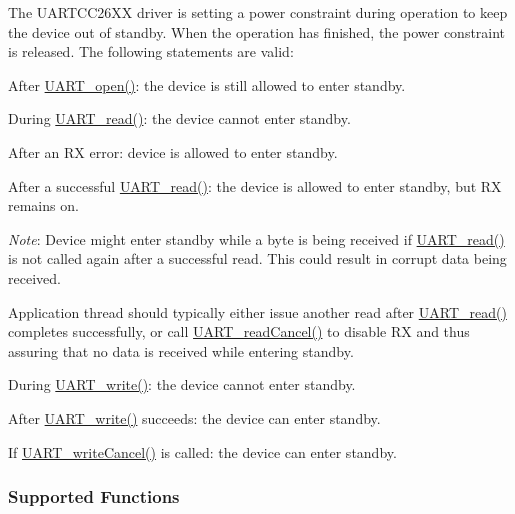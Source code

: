 The U\-A\-R\-T\-C\-C26\-X\-X driver is setting a power constraint during operation to keep the device out of standby. When the operation has finished, the power constraint is released. The following statements are valid\-:
\begin{DoxyItemize}
\item After \hyperlink{_u_a_r_t_8h_a0442ea1ec23901168da31726bb3254c1}{U\-A\-R\-T\-\_\-open()}\-: the device is still allowed to enter standby.
\item During \hyperlink{_u_a_r_t_8h_a023152d57539cad94bdd813956013e73}{U\-A\-R\-T\-\_\-read()}\-: the device cannot enter standby.
\item After an R\-X error\-: device is allowed to enter standby.
\item After a successful \hyperlink{_u_a_r_t_8h_a023152d57539cad94bdd813956013e73}{U\-A\-R\-T\-\_\-read()}\-: the device is allowed to enter standby, but R\-X remains on.
\begin{DoxyItemize}
\item {\itshape Note}\-: Device might enter standby while a byte is being received if \hyperlink{_u_a_r_t_8h_a023152d57539cad94bdd813956013e73}{U\-A\-R\-T\-\_\-read()} is not called again after a successful read. This could result in corrupt data being received.
\item Application thread should typically either issue another read after \hyperlink{_u_a_r_t_8h_a023152d57539cad94bdd813956013e73}{U\-A\-R\-T\-\_\-read()} completes successfully, or call \hyperlink{_u_a_r_t_8h_a51ed7e94d5b409ca1fcb2d65c5a25c3c}{U\-A\-R\-T\-\_\-read\-Cancel()} to disable R\-X and thus assuring that no data is received while entering standby.
\end{DoxyItemize}
\item During \hyperlink{_u_a_r_t_8h_a6f2a04c09dc17886e69e361cd80aaedc}{U\-A\-R\-T\-\_\-write()}\-: the device cannot enter standby.
\item After \hyperlink{_u_a_r_t_8h_a6f2a04c09dc17886e69e361cd80aaedc}{U\-A\-R\-T\-\_\-write()} succeeds\-: the device can enter standby.
\item If \hyperlink{_u_a_r_t_8h_a0482cd0ab9ee7e802c8e785a5754d16d}{U\-A\-R\-T\-\_\-write\-Cancel()} is called\-: the device can enter standby.
\end{DoxyItemize}

\subsubsection*{Supported Functions}

